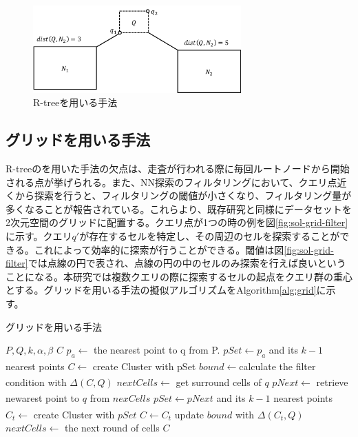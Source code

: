 \documentclass{deimj}
\theoremstyle{definition}
\begin{document}
\begin{figure}[H]
	\centering
    \includegraphics[width=8cm]{images/sol-r-tree.pdf}
    \caption{R-treeを用いる手法}
    \label{fig:sol-r-tree}
\end{figure}

\subsection{グリッドを用いる手法}
R-treeのを用いた手法の欠点は、走査が行われる際に毎回ルートノードから開始される点が挙げられる。また、NN探索のフィルタリングにおいて、クエリ点近くから探索を行うと、フィルタリングの閾値が小さくなり、フィルタリング量が多くなることが報告されている\cite{BNNH}。これらより、既存研究\cite{BNNH}と同様にデータセットを2次元空間のグリッドに配置する。クエリ点が1つの時の例を図\ref{fig:sol-grid-filter}に示す。クエリ$q'$が存在するセルを特定し、その周辺のセルを探索することができる。これによって効率的に探索が行うことができる。閾値は図\ref{fig:sol-grid-filter}では点線の円で表され、点線の円の中のセルのみ探索を行えば良いということになる。本研究では複数クエリの際に探索するセルの起点をクエリ群の重心とする。グリッドを用いる手法の擬似アルゴリズムをAlgorithm\ref{alg:grid}に示す。

\begin{algorithm}                      
\caption{グリッドを用いる手法}         
\label{alg:grid}
\begin{algorithmic}[1]                  
\renewcommand{\algorithmicrequire}{\textbf{Input:}}
\renewcommand{\algorithmicensure}{\textbf{Output:}}
\REQUIRE $P,Q,k,\alpha, \beta$
\ENSURE $C$
\STATE $p_a \xleftarrow[]{}$ the nearest point to q from P.
\STATE $pSet \xleftarrow{} p_a$ and its $k-1$ nearest points
\STATE $C \xleftarrow[]{}$ create Cluster with pSet
\STATE $bound \xleftarrow[]{} $calculate the filter condition with $\Delta(C,Q)$
\STATE $nextCells \xleftarrow[]{} $ get surround cells of $q$
\STATE $pNext \xleftarrow[]{}$ retrieve newarest point to $q$ from $nexCells$
\STATE $pSet \xleftarrow[]{} pNext$ and its $k-1$ nearest points
\STATE $C_t \xleftarrow{}$ create Cluster with $pSet$
\STATE $C \xleftarrow{} C_t$
\STATE update $bound$ with $\Delta(C_t,Q)$
\ENDIF
\STATE $nextCells \xleftarrow[]{} $ the next round of cells
\ENDWHILE
\RETURN $C$
\end{algorithmic}
\end{algorithm}
\end{document}
